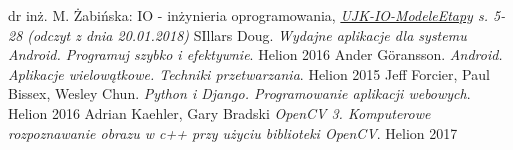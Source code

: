 \newpage
   \begin{thebibliography}{9}
    	dr inż. M. Żabińska: IO - inżynieria oprogramowania,
    	\textit{\href{http://www.ujk.edu.pl/ifiz/pl/files/lectures/Inzynieria\_oprogramowania/UJK-IO-ModeleEtapy.pdf}{UJK-IO-ModeleEtapy} s. 5-28 (odczyt z dnia 20.01.2018)}
    	SIllars Doug.
    	\textit{Wydajne aplikacje dla systemu Android. Programuj szybko i efektywnie}. 
    	Helion 2016
    	Ander Göransson. 
    	\textit{Android. Aplikacje wielowątkowe. Techniki przetwarzania}. 
    	Helion 2015
    	Jeff Forcier, Paul Bissex, Wesley Chun.
    	\textit{Python i Django. Programowanie aplikacji webowych}. 
    	Helion 2016
    	Adrian Kaehler, Gary Bradski 
    	\textit{OpenCV 3. Komputerowe rozpoznawanie obrazu w c++ przy użyciu biblioteki OpenCV}. 
    	Helion 2017   
	 \end{thebibliography}
 
